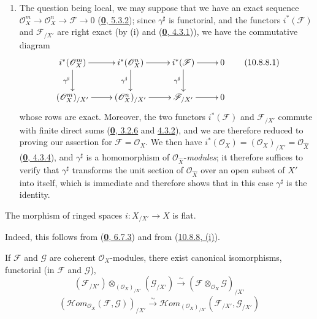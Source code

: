 \begin{enumerate}
  \item[\rm{(ii)}] The question being local, we may suppose that we have
    an exact sequence
    $\mathscr{O}_X^m\to\mathscr{O}_X^n\to\mathscr{F}\to0$
    (\hyperref[0.5.3.2]{\textbf{0}, 5.3.2}); since $\gamma^\sharp$ is
    functorial, and the functors $i^*(\mathscr{F})$ and
    $\mathscr{F}_{/X'}$ are right exact (by (i) and
    (\hyperref[0.4.3.1]{\textbf{0}, 4.3.1})), we have the commutative diagram
    \[
      \xymatrix{
        i^*(\mathscr{O}_X^m)\ar[r]\ar[d]_{\gamma^\sharp} &
        i^*(\mathscr{O}_X^n)\ar[r]\ar[d]_{\gamma^\sharp} &
        i^*(\mathscr{F})\ar[r]\ar[d]_{\gamma^\sharp} &
        0\\
        (\mathscr{O}_X^m)_{/X'}\ar[r] &
        (\mathscr{O}_X^n)_{/X'}\ar[r] &
        \mathscr{F}_{/X'}\ar[r] &
        0
      }
      \tag{10.8.8.1}\label{I.10.8.8.1}
    \]
    whose rows are exact. Moreover, the two functors
    $i^*(\mathscr{F})$ and $\mathscr{F}_{/X'}$ commute with finite direct
    sums (\hyperref[0.3.2.6]{\textbf{0}, 3.2.6} and
    \hyperref[0.4.3.2]{4.3.2}), and we are therefore reduced to proving
    our assertion for $\mathscr{F}=\mathscr{O}_X$. We then have
    $i^*(\mathscr{O}_X)=(\mathscr{O}_X)_{/X'}=
    \mathscr{O}_{\widehat X}$
    (\hyperref[0.4.3.4]{\textbf{0}, 4.3.4}), and $\gamma^\sharp$ is a
    homomorphism of $\mathscr{O}_{\widehat X}$-\emph{modules}; it therefore
    suffices to verify that $\gamma^\sharp$ transforms the unit section of
    $\mathscr{O}_{\widehat X}$ over an open subset of $X'$ into itself,
    which is immediate and therefore shows that in this case
    $\gamma^\sharp$ is the identity.
\end{enumerate}

\begin{corollary}[10.8.9]
\label{I.10.8.9}
The morphism of ringed spaces $i:X_{/X'}\to X$ is flat.
\end{corollary}

Indeed, this follows from (\hyperref[0.6.7.3]{\textbf{0}, 6.7.3}) and from
(\hyperref[I.10.8.8]{10.8.8, (i)}).

\begin{corollary}[10.8.10]
\label{I.10.8.10}
If $\mathscr{F}$ and $\mathscr{G}$ are coherent
$\mathscr{O}_X$-modules, there exist canonical isomorphisms, functorial
(in $\mathscr{F}$ and $\mathscr{G}$),
\[
  (\mathscr{F}_{/X'})\otimes_{(\mathscr{O}_X)_{/X'}}
  (\mathscr{G}_{/X'})
  \xrightarrow{\sim}
  (\mathscr{F}\otimes_{\mathscr{O}_X}\mathscr{G})_{/X'}
  \tag{10.8.10.1}\label{I.10.8.10.1}
\]
\[
  (\mathscr{H}\!om_{\mathscr{O}_X}(\mathscr{F},\mathscr{G}))_{/X'}
  \xrightarrow{\sim}
  \mathscr{H}\!om_{(\mathscr{O}_X)_{/X'}}
  (\mathscr{F}_{/X'},\mathscr{G}_{/X'})
  \tag{10.8.10.2}\label{I.10.8.10.2}
\]
\end{corollary}

